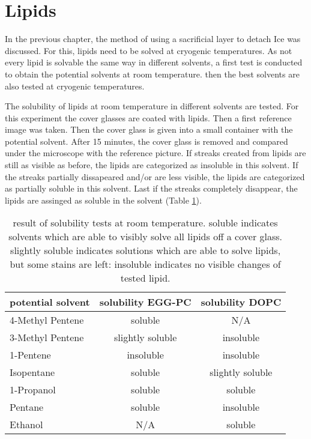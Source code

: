 

\section{Lipids}

In the previous chapter, the method of using a sacrificial layer to detach Ice was discussed. For this, lipids need to be solved at cryogenic temperatures. As not every lipid is solvable the same way in different solvents, a first test is conducted to obtain the potential solvents at room temperature. then the best solvents are also tested at cryogenic temperatures.

The solubility of lipids at room temperature in different solvents are tested. For this experiment the cover glasses are coated with lipids. Then a first reference image was taken. Then the cover glass is given into a small container with the potential solvent. After 15 minutes, the cover glass is removed and compared under the microscope with the reference picture. If streaks created from lipids are still as visible as before, the lipids are categorized as insoluble in this solvent. If the streaks partially dissapeared and/or are less visible, the lipids are categorized as partially soluble in this solvent. Last if the streaks completely disappear, the lipids are assinged as soluble in the solvent (Table \ref{table:LoeslichkeitRaumtemperatur}).


\begin{table}[hbt!]
	\centering
	\begin{tabular}{|l|c|c|}
		\hline
		potential solvent & solubility EGG-PC & solubility DOPC \\
		\hline
		\hline
		4-Methyl Pentene & soluble & N/A  \\ 
		\hline
		3-Methyl Pentene & slightly soluble & insoluble \\
		\hline
		1-Pentene & insoluble & insoluble \\
		\hline
		Isopentane & soluble & slightly soluble\\
		\hline
		1-Propanol & soluble & soluble\\
		\hline
		Pentane & soluble & insoluble\\
		\hline
		Ethanol & N/A & soluble\\
		\hline
	\end{tabular}
	\caption{result of solubility tests at room temperature. soluble indicates solvents which are able to visibly solve all lipids off a cover glass. slightly soluble indicates solutions which are able to solve lipids, but some stains are left: insoluble indicates no visible changes of tested lipid.}
	\label{table:LoeslichkeitRaumtemperatur}
\end{table}

